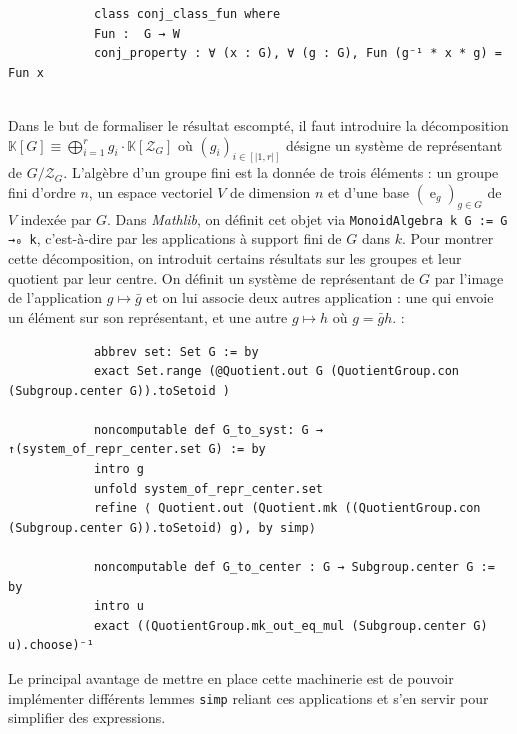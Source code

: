 \documentclass[10pt]{article}
\theoremstyle{definition}
\DeclareMathOperator{\e}{e}
\begin{document}
\begin{center}
	\begin{tcolorbox}[title = $L\exists\forall N$,width=12cm,text width=12cm,colback=lightgray!30,
		colframe=gray,sharp corners,
		rounded corners=uphill ]
		\begin{lstlisting}
			class conj_class_fun where
			Fun :  G → W
			conj_property : ∀ (x : G), ∀ (g : G), Fun (g⁻¹ * x * g) = Fun x
			
		\end{lstlisting}
	\end{tcolorbox}
\end{center}
Dans le but de formaliser le résultat escompté, il faut introduire la décomposition $\mathbb{K}[G]\equiv \bigoplus\limits_{i=1}^rg_i\cdot\mathbb{K}[\mathcal{Z}_G]$ où $(g_i)_{i\in[\!|1,r|\!]}$ désigne un système de représentant de $G/\mathcal{Z}_G$.
\newline
L'algèbre d'un groupe fini est la donnée de trois éléments : un groupe fini d'ordre $n$, un espace vectoriel $V$ de dimension $n$ et d'une base $(\e_g)_{g\in G}$ de $V$ indexée par $G$. Dans \textit{Mathlib}, on définit cet objet via \lstinline|MonoidAlgebra k G := G →₀ k|, c'est-à-dire par les applications à support fini de $G$ dans $k$.
\newline
Pour montrer cette décomposition, on introduit certains résultats sur les groupes et leur quotient par leur centre. On définit un système de représentant de $G$ par l'image de l'application $g\mapsto \bar{g}$ et on lui associe deux autres application : une qui envoie un élément sur son représentant, et une autre $g\mapsto h$ où $g=\bar{g}h$. :

\begin{center}
	\begin{tcolorbox}[title = $L\exists\forall N$,width=12cm,text width=12cm,colback=lightgray!30,
		colframe=gray,sharp corners,
		rounded corners=uphill ]
		\begin{lstlisting}
			abbrev set: Set G := by
			exact Set.range (@Quotient.out G (QuotientGroup.con (Subgroup.center G)).toSetoid )
			
			noncomputable def G_to_syst: G → ↑(system_of_repr_center.set G) := by
			intro g
			unfold system_of_repr_center.set
			refine ⟨ Quotient.out (Quotient.mk ((QuotientGroup.con (Subgroup.center G)).toSetoid) g), by simp⟩
			
			noncomputable def G_to_center : G → Subgroup.center G := by
			intro u
			exact ((QuotientGroup.mk_out_eq_mul (Subgroup.center G) u).choose)⁻¹
		\end{lstlisting}
	\end{tcolorbox}
\end{center}
Le principal avantage de mettre en place cette machinerie est de pouvoir implémenter différents lemmes \lstinline|simp| reliant ces applications et s'en servir pour simplifier des expressions.
\newline
\end{document}
